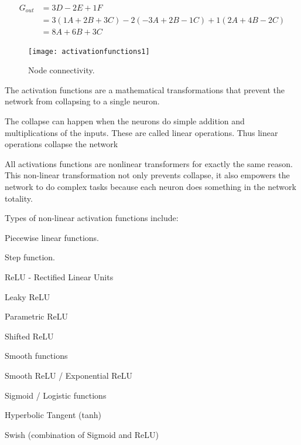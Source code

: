 	\begin{align}
		\begin{split}
		 G_{out}	& = 3D -2E + 1F	\\
				& = 3(1A + 2B + 3C) - 2(-3A + 2B -1C) + 1(2A+4B-2C)	\\
				& = 8A + 6B + 3C
		\end{split}
		\label{eq:neuronweights}
	\end{align}

 	\begin{figure}[h]
		\centering
		\texttt{[image: activationfunctions1]}
		\caption[Node connectivity]{Node connectivity.}
		\label{fig:activationfunctions1}
	\end{figure}

	\begin{bulletedlist}
		\item The activation functions are a mathematical transformations that prevent the network from collapsing to a single neuron.
		\item The collapse can happen when the neurons do simple addition and multiplications of the inputs. These are called linear operations. Thus linear operations collapse the network
		\item All activations functions are nonlinear transformers for exactly the same reason. This non-linear transformation not only prevents collapse, it also empowers the network to do complex tasks because each neuron does something in the network totality.

		\item Types of non-linear activation functions include:
		\begin{bulletedlist}
			\item Piecewise linear functions.
			\begin{bulletedlist}
				\item Step function.
				\item ReLU - Rectified Linear Units
				\item Leaky ReLU
				\item Parametric ReLU
				\item Shifted ReLU
			\end{bulletedlist}
			\item Smooth functions
			\begin{bulletedlist}
				\item Smooth ReLU / Exponential ReLU
				\item Sigmoid / Logistic functions
				\item Hyperbolic Tangent (tanh)
				\item Swish (combination of Sigmoid and ReLU)
			\end{bulletedlist}
		\end{bulletedlist}
	\end{bulletedlist}

